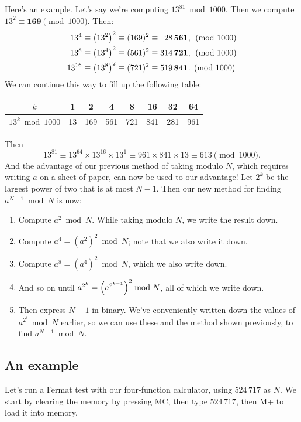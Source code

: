\documentclass[11pt,paper=letter]{scrartcl}
\begin{document}
Here's an example. Let's say we're computing $13^{81} \bmod 1000$. Then we compute $13^2 \equiv \mathbf{169} \pmod{1000}$. Then:
\begin{align*}
  13^4 \equiv \left( 13^2 \right)^2 \equiv (169)^2 &\equiv \phantom{0}28\,\mathbf{561}, \pmod{1000} \\
  13^8 \equiv \left( 13^4 \right)^2 \equiv (561)^2 &\equiv 314\,\mathbf{721}, \pmod{1000} \\
  13^{16} \equiv \left( 13^8 \right)^2 \equiv (721)^2 &\equiv 519\,\mathbf{841}. \pmod{1000}
\end{align*}
We can continue this way to fill up the following table:
\begin{center}
  \begin{tabular}{c|ccccccc}
  $k$ & 1 & 2 & 4 & 8 & 16 & 32 & 64 \\ \hline
  $13^k \bmod 1000$ & 13 & 169 & 561 & 721 & 841 & 281 & 961
  \end{tabular}
\end{center}
Then
$$13^{81} \equiv 13^{64} \times 13^{16} \times 13^1 \equiv 961 \times 841 \times 13 \equiv 613 \pmod{1000}.$$
And the advantage of our previous method of taking modulo $N$, which requires writing $a$ on a sheet of paper, can now be used to our advantage! Let $2^k$ be the largest power of two that is at most $N-1$. Then our new method for finding $a^{N-1} \bmod N$ is now:
\begin{enumerate}
  \item Compute $a^2 \bmod N$. While taking modulo $N$, we write the result down.
  \item Compute $a^4 = (a^2)^2 \bmod N$; note that we also write it down.
  \item Compute $a^8 = (a^4)^2 \bmod N$, which we also write down.
  \item And so on until $a^{2^k} = \left( a^{2^{k-1}} \right)^2 \bmod N$, all of which we write down.
  \item Then express $N-1$ in binary. We've conveniently written down the values of $a^{2^i} \bmod N$ earlier, so we can use these and the method shown previously, to find $a^{N-1} \bmod N$.
\end{enumerate}

\subsection{An example}

Let's run a Fermat test with our four-function calculator, using $524\,717$ as $N$. We start by clearing the memory by pressing MC, then type $524\,717$, then M+ to load it into memory.
\end{document}
